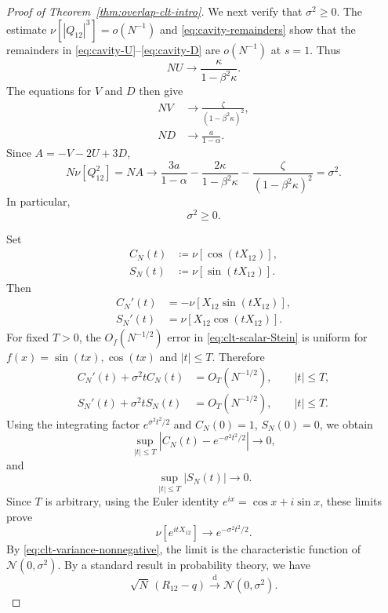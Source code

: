 \documentclass[11pt]{article}
\numberwithin{equation}{section}
\newcommand{\1}{\mathbf 1}
\begin{document}
\begin{proof}[Proof of Theorem~\ref{thm:overlap-clt-intro}]
We next verify that $\sigma^2\ge0$.  The estimate
$\nu[|Q_{12}|^3]=o(N^{-1})$ and
\eqref{eq:cavity-remainders} show that the remainders in
\eqref{eq:cavity-U}--\eqref{eq:cavity-D} are $o(N^{-1})$ at $s=1$.
Thus
\begin{equation}
 NU\longrightarrow\frac{\kappa}{1-\beta^2\kappa}.
 \label{eq:clt-second-U}
\end{equation}
The equations for $V$ and $D$ then give
\begin{align}
 NV&\longrightarrow\frac{\zeta}{(1-\beta^2\kappa)^2},
 \label{eq:clt-second-V}\\
 ND&\longrightarrow\frac{a}{1-\alpha}.
 \label{eq:clt-second-D}
\end{align}
Since $A=-V-2U+3D$,
\begin{equation}
 N\nu[Q_{12}^2]=NA\longrightarrow
 \frac{3a}{1-\alpha}
 -\frac{2\kappa}{1-\beta^2\kappa}
 -\frac{\zeta}{(1-\beta^2\kappa)^2}
 =\sigma^2.
 \label{eq:clt-second-moment-limit}
\end{equation}
In particular,
\begin{equation}
 \sigma^2\ge0.
 \label{eq:clt-variance-nonnegative}
\end{equation}

Set
\begin{align}
 C_N(t)&\coloneqq\nu[\cos(tX_{12})],
 \label{eq:clt-CN}\\
 S_N(t)&\coloneqq\nu[\sin(tX_{12})].
 \label{eq:clt-SN}
\end{align}
Then
\begin{align}
 C_N'(t)&=-\nu[X_{12}\sin(tX_{12})],
 \label{eq:clt-CN-derivative}\\
 S_N'(t)&=\nu[X_{12}\cos(tX_{12})].
 \label{eq:clt-SN-derivative}
\end{align}
For fixed $T>0$, the $O_f(N^{-1/2})$ error in
\eqref{eq:clt-scalar-Stein} is uniform for
$f(x)=\sin(tx),\cos(tx)$ and $|t|\le T$.  Therefore
\begin{align}
 C_N'(t)+\sigma^2tC_N(t)
 &=O_T(N^{-1/2}),
 \qquad |t|\le T,
 \label{eq:clt-C-approx-ODE}\\
 S_N'(t)+\sigma^2tS_N(t)
 &=O_T(N^{-1/2}),
 \qquad |t|\le T.
 \label{eq:clt-S-approx-ODE}
\end{align}
Using the integrating factor $e^{\sigma^2t^2/2}$ and
$C_N(0)=1$, $S_N(0)=0$, we obtain
\begin{equation}
 \sup_{|t|\le T}
 \left|C_N(t)-e^{-\sigma^2t^2/2}\right|
 \longrightarrow0,
 \label{eq:clt-C-uniform}
\end{equation}
and
\begin{equation}
 \sup_{|t|\le T}|S_N(t)|\longrightarrow0.
 \label{eq:clt-S-uniform}
\end{equation}
Since $T$ is arbitrary, using the Euler identity $e^{ix} = \cos{x} + i \sin{x}$,  these limits prove
\[
 \nu[e^{itX_{12}}]\longrightarrow e^{-\sigma^2t^2/2}.
\]
By \eqref{eq:clt-variance-nonnegative}, the limit is the characteristic
function of $\mathcal N(0,\sigma^2)$. By a standard result in probability theory, we have  
\[
 \sqrt N\,(R_{12}-q)\xrightarrow{\mathrm d}\mathcal N(0,\sigma^2).
\]
\end{proof}
\end{document}
